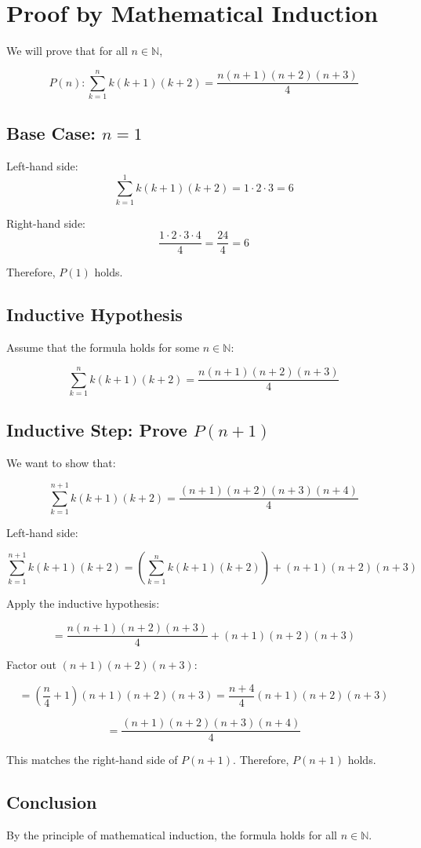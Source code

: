 \documentclass{article}
\begin{document}
\section*{Proof by Mathematical Induction}

We will prove that for all $n \in \mathbb{N}$,

\[
P(n): \sum_{k=1}^{n} k(k+1)(k+2) = \frac{n(n+1)(n+2)(n+3)}{4}
\]

\subsection*{Base Case: $n = 1$}

Left-hand side:
\[
\sum_{k=1}^{1} k(k+1)(k+2) = 1 \cdot 2 \cdot 3 = 6
\]

Right-hand side:
\[
\frac{1 \cdot 2 \cdot 3 \cdot 4}{4} = \frac{24}{4} = 6
\]

Therefore, $P(1)$ holds.

\subsection*{Inductive Hypothesis}

Assume that the formula holds for some $n \in \mathbb{N}$:

\[
\sum_{k=1}^{n} k(k+1)(k+2) = \frac{n(n+1)(n+2)(n+3)}{4}
\]

\subsection*{Inductive Step: Prove $P(n+1)$}

We want to show that:

\[
\sum_{k=1}^{n+1} k(k+1)(k+2) = \frac{(n+1)(n+2)(n+3)(n+4)}{4}
\]

Left-hand side:

\[
\sum_{k=1}^{n+1} k(k+1)(k+2) = \left( \sum_{k=1}^{n} k(k+1)(k+2) \right) + (n+1)(n+2)(n+3)
\]

Apply the inductive hypothesis:

\[
= \frac{n(n+1)(n+2)(n+3)}{4} + (n+1)(n+2)(n+3)
\]

Factor out $(n+1)(n+2)(n+3)$:

\[
= \left( \frac{n}{4} + 1 \right)(n+1)(n+2)(n+3) = \frac{n+4}{4}(n+1)(n+2)(n+3)
\]

\[
= \frac{(n+1)(n+2)(n+3)(n+4)}{4}
\]

This matches the right-hand side of $P(n+1)$. Therefore, $P(n+1)$ holds.

\subsection*{Conclusion}

By the principle of mathematical induction, the formula holds for all $n \in \mathbb{N}$.
\end{document}

